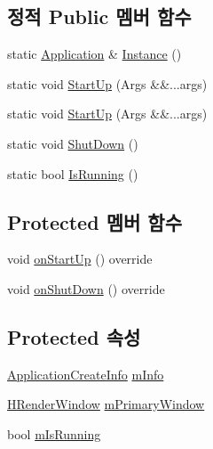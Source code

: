 \subsection*{정적 Public 멤버 함수}
\begin{DoxyCompactItemize}
\item 
static \hyperlink{classcpf_1_1_application}{Application} \& \hyperlink{classcpf_1_1_t_module_ac8065254584cb0a6656c42f96859d190}{Instance} ()
\item 
static void \hyperlink{classcpf_1_1_t_module_a02fbf3c4d28a3328e81b0e8d0bdd93b0}{Start\+Up} (Args \&\&...args)
\item 
static void \hyperlink{classcpf_1_1_t_module_ac553266ad6255da045ef3f34b0f9bc16}{Start\+Up} (Args \&\&...args)
\item 
static void \hyperlink{classcpf_1_1_t_module_a61452801c61e2546b75a7a6a545e82ee}{Shut\+Down} ()
\item 
static bool \hyperlink{classcpf_1_1_t_module_acd38943803d522ba6dcf7f0871b2f502}{Is\+Running} ()
\end{DoxyCompactItemize}
\subsection*{Protected 멤버 함수}
\begin{DoxyCompactItemize}
\item 
void \hyperlink{classcpf_1_1_application_ae8e759c8722c48c45dc3e02446062aec}{on\+Start\+Up} () override
\item 
void \hyperlink{classcpf_1_1_application_afa25d5eb462d3d5b1ce19c6d217fe9e7}{on\+Shut\+Down} () override
\end{DoxyCompactItemize}
\subsection*{Protected 속성}
\begin{DoxyCompactItemize}
\item 
\hyperlink{structcpf_1_1_application_create_info}{Application\+Create\+Info} \hyperlink{classcpf_1_1_application_aeef620fe71f2ac891e3650d6d3462b28}{m\+Info}
\item 
\hyperlink{namespacecpf_af5ffcc39bb6465427fc3b91366c917f6}{H\+Render\+Window} \hyperlink{classcpf_1_1_application_a112167287be2ff0ee64a793c6a93fa3d}{m\+Primary\+Window}
\item 
bool \hyperlink{classcpf_1_1_application_a84a6e2bafcc39719acee9885a064ac75}{m\+Is\+Running}
\end{DoxyCompactItemize}
